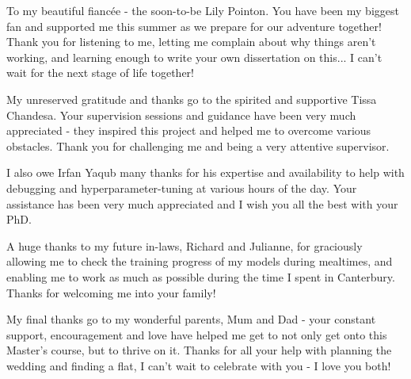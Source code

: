\cleardoublepage


\begin{acknowledgements}

To my beautiful fiancée - the soon-to-be Lily Pointon. You have been my biggest fan and supported me this summer as we prepare for our adventure together! Thank you for listening to me, letting me complain about why things aren't working, and learning enough to write your own dissertation on this... I can't wait for the next stage of life together! 

My unreserved gratitude and thanks go to the spirited and supportive Tissa Chandesa. Your supervision sessions and guidance have been very much appreciated - they inspired this project and helped me to overcome various obstacles. Thank you for challenging me and being a very attentive supervisor.

I also owe Irfan Yaqub many thanks for his expertise and availability to help with debugging and hyperparameter-tuning at various hours of the day. Your assistance has been very much appreciated and I wish you all the best with your PhD.

A huge thanks to my future in-laws, Richard and Julianne, for graciously allowing me to check the training progress of my models during mealtimes, and enabling me to work as much as possible during the time I spent in Canterbury. Thanks for welcoming me into your family!

My final thanks go to my wonderful parents, Mum and Dad - your constant support, encouragement and love have helped me get to not only get onto this Master's course, but to thrive on it. Thanks for all your help with planning the wedding and finding a flat, I can't wait to celebrate with you - I love you both!

\end{acknowledgements}